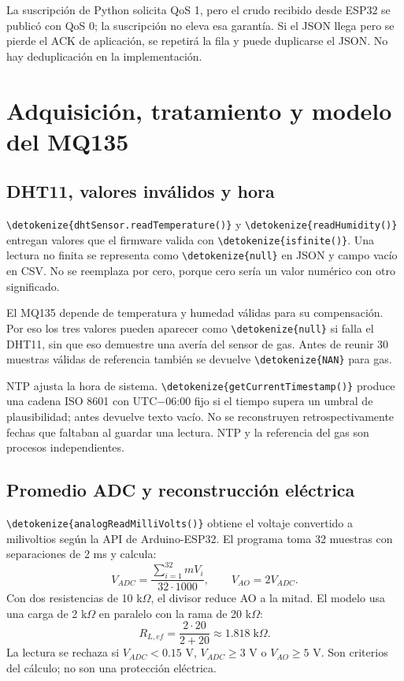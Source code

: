 \documentclass[11pt,a4paper]{article}
\newcommand{\code}[1]{\expandafter\nolinkurl\expandafter{\detokenize{#1}}}
\newcommand{\nextsection}[1]{\clearpage\section{#1}}
\begin{document}
La suscripción de Python solicita QoS 1, pero el crudo recibido desde ESP32 se publicó con QoS 0; la suscripción no eleva esa garantía. Si el JSON llega pero se pierde el ACK de aplicación, se repetirá la fila y puede duplicarse el JSON. No hay deduplicación en la implementación.

\nextsection{Adquisición, tratamiento y modelo del MQ135}
\subsection{DHT11, valores inválidos y hora}
\code{dhtSensor.readTemperature()} y \code{readHumidity()} entregan valores que el firmware valida con \code{isfinite()}. Una lectura no finita se representa como \code{null} en JSON y campo vacío en CSV. No se reemplaza por cero, porque cero sería un valor numérico con otro significado.

El MQ135 depende de temperatura y humedad válidas para su compensación. Por eso los tres valores pueden aparecer como \code{null} si falla el DHT11, sin que eso demuestre una avería del sensor de gas. Antes de reunir 30 muestras válidas de referencia también se devuelve \code{NAN} para gas.

NTP ajusta la hora de sistema. \code{getCurrentTimestamp()} produce una cadena ISO 8601 con UTC$-$06:00 fijo si el tiempo supera un umbral de plausibilidad; antes devuelve texto vacío. No se reconstruyen retrospectivamente fechas que faltaban al guardar una lectura. NTP y la referencia del gas son procesos independientes.

\subsection{Promedio ADC y reconstrucción eléctrica}
\code{analogReadMilliVolts()} obtiene el voltaje convertido a milivoltios según la API de Arduino-ESP32.\cite{adc} El programa toma 32 muestras con separaciones de 2 ms y calcula:
\[
V_{ADC}=\frac{\sum_{i=1}^{32} mV_i}{32\cdot1000},\qquad
V_{AO}=2V_{ADC}.
\]
Con dos resistencias de 10 k$\Omega$, el divisor reduce AO a la mitad. El modelo usa una carga de 2 k$\Omega$ en paralelo con la rama de 20 k$\Omega$:
\[
R_{L,ef}=\frac{2\cdot20}{2+20}\approx1.818\;\text{k}\Omega.
\]
La lectura se rechaza si $V_{ADC}<0.15$ V, $V_{ADC}\ge3$ V o $V_{AO}\ge5$ V. Son criterios del cálculo; no son una protección eléctrica.
\end{document}
